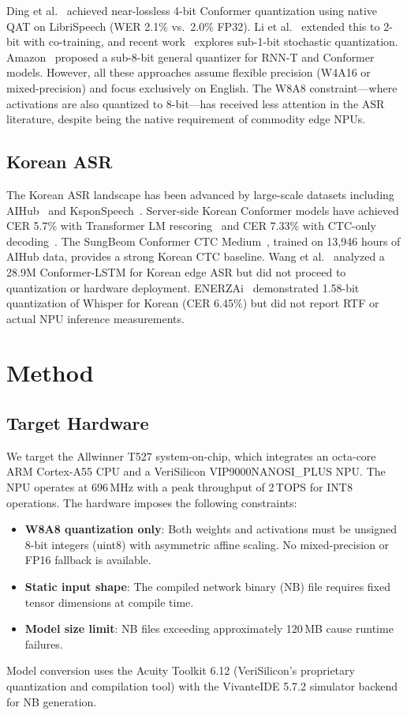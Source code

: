 \documentclass[a4paper,11pt,twocolumn]{article}
\begin{document}
Ding et al.~\cite{ding2022} achieved near-lossless 4-bit Conformer quantization using native QAT on LibriSpeech (WER 2.1\% vs.\ 2.0\% FP32). Li et al.~\cite{li2023} extended this to 2-bit with co-training, and recent work~\cite{chen2025} explores sub-1-bit stochastic quantization. Amazon~\cite{amazon2022} proposed a sub-8-bit general quantizer for RNN-T and Conformer models. However, all these approaches assume flexible precision (W4A16 or mixed-precision) and focus exclusively on English. The W8A8 constraint---where activations are also quantized to 8-bit---has received less attention in the ASR literature, despite being the native requirement of commodity edge NPUs.

\subsection{Korean ASR}

The Korean ASR landscape has been advanced by large-scale datasets including AIHub~\cite{aihub} and KsponSpeech~\cite{bang2020}. Server-side Korean Conformer models have achieved CER 5.7\% with Transformer LM rescoring~\cite{koo2021} and CER 7.33\% with CTC-only decoding~\cite{speechbrain}. The SungBeom Conformer CTC Medium~\cite{sungbeom}, trained on 13,946 hours of AIHub data, provides a strong Korean CTC baseline. Wang et al.~\cite{wang2023} analyzed a 28.9M Conformer-LSTM for Korean edge ASR but did not proceed to quantization or hardware deployment. ENERZAi~\cite{enerzai2025} demonstrated 1.58-bit quantization of Whisper for Korean (CER 6.45\%) but did not report RTF or actual NPU inference measurements.

\section{Method}

\subsection{Target Hardware}

We target the Allwinner T527 system-on-chip, which integrates an octa-core ARM Cortex-A55 CPU and a VeriSilicon VIP9000NANOSI\_PLUS NPU. The NPU operates at 696\,MHz with a peak throughput of 2\,TOPS for INT8 operations. The hardware imposes the following constraints:
\begin{itemize}[leftmargin=*,itemsep=1pt]
    \item \textbf{W8A8 quantization only}: Both weights and activations must be unsigned 8-bit integers (uint8) with asymmetric affine scaling. No mixed-precision or FP16 fallback is available.
    \item \textbf{Static input shape}: The compiled network binary (NB) file requires fixed tensor dimensions at compile time.
    \item \textbf{Model size limit}: NB files exceeding approximately 120\,MB cause runtime failures.
\end{itemize}
Model conversion uses the Acuity Toolkit 6.12 (VeriSilicon's proprietary quantization and compilation tool) with the VivanteIDE 5.7.2 simulator backend for NB generation.
\end{document}
